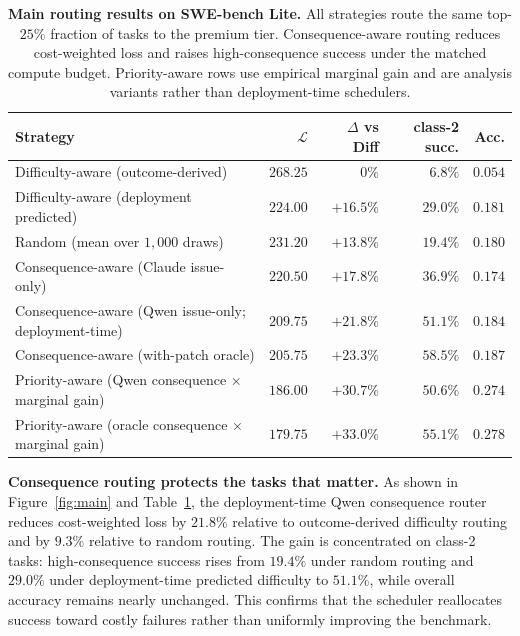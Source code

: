 \documentclass{article}
\begin{document}
\begin{table}[t]
\centering
\caption{\textbf{Main routing results on SWE-bench Lite.}
All strategies route the same top-$25\%$ fraction of tasks to the
premium tier. Consequence-aware routing reduces cost-weighted loss and
raises high-consequence success under the matched compute budget.
Priority-aware rows use empirical marginal gain and are analysis
variants rather than deployment-time schedulers.}
\label{tab:main}
\small
\begin{tabular}{lrrrr}
\toprule
Strategy & $\mathcal{L}$ & $\Delta$ vs Diff & class-2 succ. & Acc. \\
\midrule
Difficulty-aware (outcome-derived)                         & $268.25$ & ~~$0\%$ & $6.8\%$ & $0.054$ \\
Difficulty-aware (deployment predicted)                    & $224.00$ & $+16.5\%$ & $29.0\%$ & $0.181$ \\
Random (mean over $1{,}000$ draws)                         & $231.20$ & $+13.8\%$ & $19.4\%$ & $0.180$ \\
\midrule
Consequence-aware (Claude issue-only)                      & $220.50$ & $+17.8\%$ & $36.9\%$ & $0.174$ \\
Consequence-aware (Qwen issue-only; deployment-time)        & $209.75$ & $+21.8\%$ & $\mathbf{51.1\%}$ & $0.184$ \\
Consequence-aware (with-patch oracle)                       & $205.75$ & $+23.3\%$ & $58.5\%$ & $0.187$ \\
\midrule
Priority-aware (Qwen consequence $\times$ marginal gain)    & $186.00$ & $+30.7\%$ & $50.6\%$ & $0.274$ \\
Priority-aware (oracle consequence $\times$ marginal gain)  & $\mathbf{179.75}$ & $\mathbf{+33.0\%}$ & $55.1\%$ & $\mathbf{0.278}$ \\
\bottomrule
\end{tabular}
\end{table}

\textbf{Consequence routing protects the tasks that matter.}
As shown in Figure~\ref{fig:main} and Table~\ref{tab:main}, the
deployment-time Qwen consequence router reduces cost-weighted loss by
$21.8\%$ relative to outcome-derived difficulty routing and by $9.3\%$
relative to random routing. The gain is concentrated on class-2 tasks:
high-consequence success rises from $19.4\%$ under random routing and
$29.0\%$ under deployment-time predicted difficulty to $51.1\%$, while
overall accuracy remains nearly unchanged. This confirms that the
scheduler reallocates success toward costly failures rather than
uniformly improving the benchmark.
\end{document}
